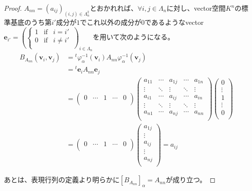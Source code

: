 \documentclass[dvipdfmx]{jsarticle}
\begin{document}
\begin{proof}
$A_{nn} = \left( a_{ij} \right)_{(i,j) \in \varLambda_{n}^{2}}$とおかれれば、$\forall i,j \in \varLambda_{n}$に対し、vector空間$K^{n}$の標準基底のうち第$i'$成分が$1$でこれ以外の成分が$0$であるようなvector$\mathbf{e}_{i'} = \left( \left\{ \begin{matrix}
1 & \mathrm{if} & i = i' \\
0 & \mathrm{if} & i \neq i' \\
\end{matrix} \right.\  \right)_{i \in \varLambda_{n}}$を用いて次のようになる。
\begin{align*}
B_{A_{nn}}\left( \mathbf{v}_{i},\mathbf{v}_{j} \right) &={}^{t}\varphi_{\alpha}^{- 1}\left( \mathbf{v}_{i} \right)A_{nn}\varphi_{\alpha}^{- 1}\left( \mathbf{v}_{j} \right)\\
&={}^{t}\mathbf{e}_{i}A_{nn}\mathbf{e}_{j}\\
&= \begin{pmatrix}
0 & \cdots & 1 & \cdots & 0 \\
\end{pmatrix}\begin{pmatrix}
a_{11} & \cdots & a_{1j} & \cdots & a_{1n} \\
 \vdots & \ddots & \vdots & \ddots & \vdots \\
a_{i1} & \cdots & a_{ij} & \cdots & a_{in} \\
 \vdots & \ddots & \vdots & \ddots & \vdots \\
a_{n1} & \cdots & a_{nj} & \cdots & a_{nn} \\
\end{pmatrix}\begin{pmatrix}
0 \\
 \vdots \\
1 \\
 \vdots \\
0 \\
\end{pmatrix}\\
&= \begin{pmatrix}
0 & \cdots & 1 & \cdots & 0 \\
\end{pmatrix}\begin{pmatrix}
a_{1j} \\
 \vdots \\
a_{ij} \\
 \vdots \\
a_{nj} \\
\end{pmatrix} = a_{ij}
\end{align*}\par
あとは、表現行列の定義より明らかに$\left[ B_{A_{nn}} \right]_{\alpha} = A_{nn}$が成り立つ。
\end{proof}
\end{document}

